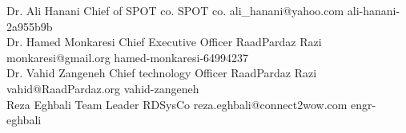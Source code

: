 
\begin{multicols}{2}
\begin{referees}
    {Dr. Ali Hanani}
    {Chief of SPOT co.}
    {SPOT co.}
    {ali_hanani@yahoo.com}
    {ali-hanani-2a955b9b}\\
		{Dr. Hamed Monkaresi}
		{Chief Executive Officer}
		{RaadPardaz Razi}
		{monkaresi@gmail.org}
		{hamed-monkaresi-64994237}\\

		{Dr. Vahid Zangeneh}
		{Chief technology Officer }
		{RaadPardaz Razi}
		{vahid@RaadPardaz.org}
		{vahid-zangeneh}\\
		{Reza Eghbali}
		{Team Leader}
		{RDSysCo}
		{reza.eghbali@connect2wow.com}
		{engr-eghbali}
		\end{referees}
		
\end{multicols}